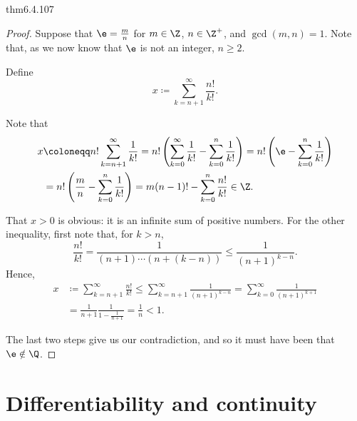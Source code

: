 \begin{thm}{}{thm6.4.107}
\begin{proof}
Suppose that $\e =\frac{m}{n}$ for $m\in \Z$, $n\in \Z ^+$, and $\gcd (m,n)=1$.  Note that, as we now know that $\e$ is not an integer, $n\geq 2$.

Define
\begin{equation}
x\coloneqq \sum _{k=n+1}^{\infty}\frac{n!}{k!}.
\end{equation}

Note that
\begin{equation}
\begin{split}
x & \coloneqq n!\sum _{k=n+1}^{\infty}\frac{1}{k!}=n!\left( \sum _{k=0}^{\infty}\frac{1}{k!}-\sum _{k=0}^n\frac{1}{k!}\right) =n!\left( \e -\sum _{k=0}^n\frac{1}{k!}\right) \\
& =n!\left( \frac{m}{n}-\sum _{k=0}^n\frac{1}{k!}\right) =m(n-1)!-\sum _{k=0}^n\frac{n!}{k!}\in \Z .
\end{split}
\end{equation}

That $x>0$ is obvious:  it is an infinite sum of positive numbers.  For the other inequality, first note that, for $k>n$,
\begin{equation}
\frac{n!}{k!}=\frac{1}{(n+1)\cdots (n+(k-n))}\leq \frac{1}{(n+1)^{k-n}}.
\end{equation}
Hence,
\begin{equation}
\begin{split}
x & \coloneqq \sum _{k=n+1}^{\infty}\frac{n!}{k!}\leq \sum _{k=n+1}^{\infty}\frac{1}{(n+1)^{k-n}}=\sum _{k=0}^{\infty}\frac{1}{(n+1)^{k+1}} \\
& =\frac{1}{n+1}\frac{1}{1-\tfrac{1}{n+1}}=\frac{1}{n}<1.
\end{split}
\end{equation}

The last two steps give us our contradiction, and so it must have been that $\e \notin \Q$.
\end{proof}
\end{thm}

\section{Differentiability and continuity}

